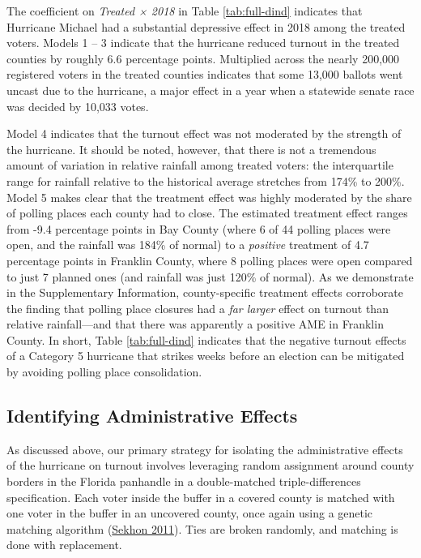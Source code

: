 \documentclass[
  12pt,
]{article}
\begin{document}
\begin{singlespace}

\end{singlespace}

The coefficient on \emph{Treated × 2018} in Table \ref{tab:full-dind} indicates that Hurricane Michael had a substantial depressive effect in 2018 among the treated voters. Models 1 -- 3 indicate that the hurricane reduced turnout in the treated counties by roughly 6.6 percentage points. Multiplied across the nearly 200,000 registered voters in the treated counties indicates that some 13,000 ballots went uncast due to the hurricane, a major effect in a year when a statewide senate race was decided by 10,033 votes.

Model 4 indicates that the turnout effect was not moderated by the strength of the hurricane. It should be noted, however, that there is not a tremendous amount of variation in relative rainfall among treated voters: the interquartile range for rainfall relative to the historical average stretches from 174\% to 200\%. Model 5 makes clear that the treatment effect was highly moderated by the share of polling places each county had to close. The estimated treatment effect ranges from -9.4 percentage points in Bay County (where 6 of 44 polling places were open, and the rainfall was 184\% of normal) to a \emph{positive} treatment of 4.7 percentage points in Franklin County, where 8 polling places were open compared to just 7 planned ones (and rainfall was just 120\% of normal). As we demonstrate in the Supplementary Information, county-specific treatment effects corroborate the finding that polling place closures had a \emph{far larger} effect on turnout than relative rainfall---and that there was apparently a positive AME in Franklin County. In short, Table \ref{tab:full-dind} indicates that the negative turnout effects of a Category 5 hurricane that strikes weeks before an election can be mitigated by avoiding polling place consolidation.

\hypertarget{identifying-administrative-effects}{%
\subsection*{Identifying Administrative Effects}\label{identifying-administrative-effects}}

As discussed above, our primary strategy for isolating the administrative effects of the hurricane on turnout involves leveraging random assignment around county borders in the Florida panhandle in a double-matched triple-differences specification. Each voter inside the buffer in a covered county is matched with one voter in the buffer in an uncovered county, once again using a genetic matching algorithm (\protect\hyperlink{ref-Sekhon2011}{Sekhon 2011}). Ties are broken randomly, and matching is done with replacement.
\end{document}
